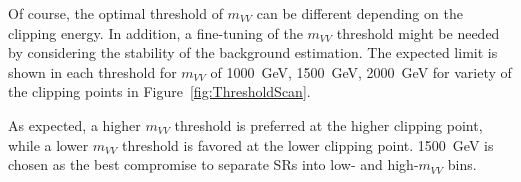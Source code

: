 \begin{table}[ht!]
\small
\begin{center}
\caption{Expected signal strength and limits in every two options. only \tlep~channel is used for the fit. The result for single bin fit with RNN is also shown as a reference. The normalization fitted for the standard model signal, and Z backgrounds are shown as Norm in the table.}
\label{tab:2binlimit}
\end{center}
\end{table}

Of course, the optimal threshold of $m_{VV}$ can be different depending on the clipping energy.
In addition, a fine-tuning of the $m_{VV}$ threshold might be needed by considering the stability of the background estimation.
The expected limit is shown in each threshold for $m_{VV}$ of 1000~GeV, 1500~GeV, 2000~GeV for variety of the clipping points in Figure~\ref{fig:ThresholdScan}.

As expected, a higher $m_{VV}$ threshold is preferred at the higher clipping point, while a lower $m_{VV}$ threshold is favored at the lower clipping point.
1500~GeV is chosen as the best compromise to separate SRs into low- and high-$m_{VV}$ bins.

